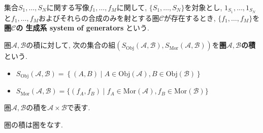 \begin{Def}
集合$S_1,\dots,S_N$に関する写像$f_1,\dots,f_M$に関して,
$\{S_1,\dots,S_N\}$を対象とし,
$1_{S_1},\dots,1_{S_N}$と$f_1,\dots,f_M$およびそれらの合成のみを射とする圏$\mathscr{C}$が存在するとき, $\{f_1,\dots,f_M\}$を
{\bf 圏$\mathscr{C}$の
生成系 system of generators
}という.
\end{Def}
\begin{Def}
圏$\mathscr{A},\mathscr{B}$の積に対して, 次の集合の組$(S_{\mathrm{Obj}}\left(\mathscr{A},\mathscr{B}\right),S_{\mathrm{Mor}}\left(\mathscr{A},\mathscr{B}\right))$を{\bf 圏$\mathscr{A},\mathscr{B}$の積}という.
\begin{itemize}
\item $S_{\mathrm{Obj}}\left(\mathscr{A},\mathscr{B}\right)
=\left\{(A,B)\mid A\in\mathrm{Obj}(\mathscr{A}),B\in\mathrm{Obj}(\mathscr{B})\right\}$
\item $S_{\mathrm{Mor}}\left(\mathscr{A},\mathscr{B}\right)
=\{(f_A,f_B)\mid f_A\in\mathrm{Mor(\mathscr{A})},
f_B\in\mathrm{Mor(\mathscr{B})}\}$
\end{itemize}
\end{Def}
\begin{Def}
圏$\mathscr{A},\mathscr{B}$の積を$\mathscr{A}\times\mathscr{B}$で表す.
\end{Def}
\begin{Prop}\label{Prop:category product}
圏の積は圏をなす.
\end{Prop}


